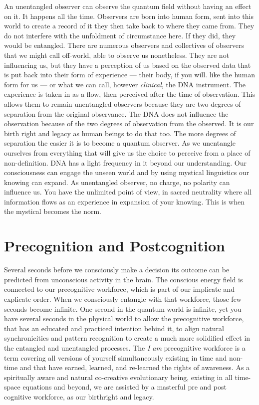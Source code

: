 \documentclass[letterpaper,11pt,twoside,titlepage,onecolumn,openany]{book}
\begin{document}
An unentangled observer can observe the quantum field without having an
effect on it. It happens all the time. Observers are born into human
form, sent into this world to create a record of it they then take back
to where they came from. They do not interfere with the unfoldment of
circumstance here. If they did, they would be entangled. There are
numerous observers and collectives of observers that we might call
off-world, able to observe us nonetheless. They are not influencing us,
but they have a perception of us based on the observed data that is put
back into their form of experience --- their body, if you will. like the
human form for us --- or what we can call, however \emph{clinical}, the
DNA instrument. The experience is taken in as a flow, then perceived
after the time of observation. This allows them to remain unentangled
observers because they are two degrees of separation from the original
observance. The DNA does not influence the observation because of the
two degrees of observation from the observed. It is our birth right and
legacy as human beings to do that too. The more degrees of separation
the easier it is to become a quantum observer. As we unentangle
ourselves from everything that will give us the choice to perceive from
a place of non-definition. DNA has a light frequency in it beyond our
understanding. Our consciousness can engage the unseen world and by
using mystical linguistics our knowing can expand. As unentangled
observer, no charge, no polarity can influence us. You have the
unlimited point of view, in sacred neutrality where all information
flows as an experience in expansion of your knowing. This is when the
mystical becomes the norm.

\section*{Precognition and
Postcognition}\label{precognition-and-postcognition}

Several seconds before we consciously make a decision its outcome can be
predicted from unconscious activity in the brain. The conscious energy
field is connected to our precognitive workforce, which is part of our
implicate and explicate order. When we consciously entangle with that
workforce, those few seconds become infinite. One second in the quantum
world is infinite, yet you have several seconds in the physical world to
allow the precognitive workforce, that has an educated and practiced
intention behind it, to align natural synchronicities and pattern
recognition to create a much more solidified effect in the entangled and
unentangled processes. The \emph{I am} precognitive workforce is a term
covering all versions of yourself simultaneously existing in time and
non-time and that have earned, learned, and re-learned the rights of
awareness. As a spiritually aware and natural co-creative evolutionary
being, existing in all time-space equations and beyond, we are assisted
by a masterful pre and post cognitive workforce, as our birthright and
legacy.
\end{document}
